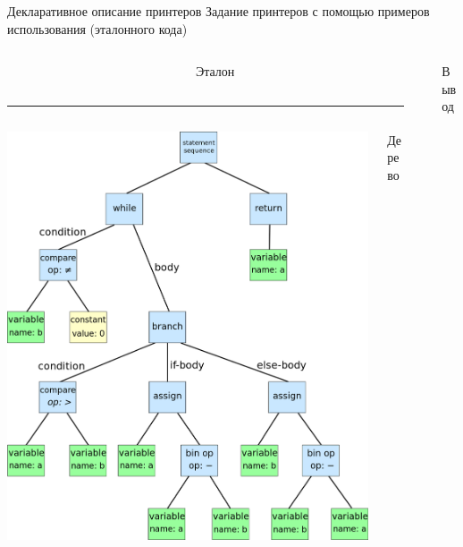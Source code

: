 \documentclass[sans]{beamer}
\begin{document}
\begin{frame}{Декларативное описание принтеров}
Задание принтеров с помощью примеров использования (эталонного кода)

\begin{columns}
  \begin{column}{0.4\linewidth}
    \begin{columns}
      \begin{column}{0.6\linewidth}
        \scriptsize
        \inputminted{java}{codes/whileEx.java}
      \end{column}
      \begin{column}{0.4\linewidth}
        Эталон
      \end{column}
    \end{columns}
    \hrule
    \vspace{1mm}
    \begin{columns}
      \begin{column}{0.6\linewidth}
        \includegraphics[width = \linewidth]{../semiPres/images/ast.png}
      \end{column}
      \begin{column}{0.4\linewidth}
        Дерево
      \end{column}
    \end{columns}

  \end{column}
  \begin{column}{0.25\linewidth}
    \scriptsize
    \inputminted{java}{codes/whileRes.java}
  \end{column}
  \begin{column}{0.1\linewidth}
    Вывод
  \end{column}
\end{columns}
\end{frame}
\end{document}
